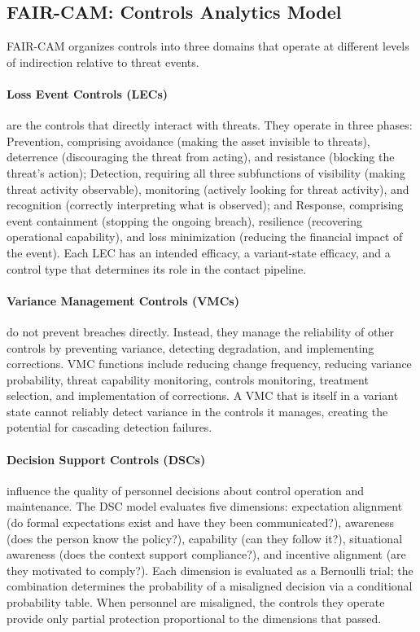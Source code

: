 \documentclass[11pt,a4paper]{article}
\begin{document}
\subsection{FAIR-CAM: Controls Analytics Model}
\label{sec:faircam}

FAIR-CAM organizes controls into three domains that operate at different levels of indirection relative to threat events.

\paragraph{Loss Event Controls (LECs)} are the controls that directly interact with threats. They operate in three phases: Prevention, comprising avoidance (making the asset invisible to threats), deterrence (discouraging the threat from acting), and resistance (blocking the threat's action); Detection, requiring all three subfunctions of visibility (making threat activity observable), monitoring (actively looking for threat activity), and recognition (correctly interpreting what is observed); and Response, comprising event containment (stopping the ongoing breach), resilience (recovering operational capability), and loss minimization (reducing the financial impact of the event). Each LEC has an intended efficacy, a variant-state efficacy, and a control type that determines its role in the contact pipeline.

\paragraph{Variance Management Controls (VMCs)} do not prevent breaches directly. Instead, they manage the reliability of other controls by preventing variance, detecting degradation, and implementing corrections. VMC functions include reducing change frequency, reducing variance probability, threat capability monitoring, controls monitoring, treatment selection, and implementation of corrections. A VMC that is itself in a variant state cannot reliably detect variance in the controls it manages, creating the potential for cascading detection failures.

\paragraph{Decision Support Controls (DSCs)} influence the quality of personnel decisions about control operation and maintenance. The DSC model evaluates five dimensions: expectation alignment (do formal expectations exist and have they been communicated?), awareness (does the person know the policy?), capability (can they follow it?), situational awareness (does the context support compliance?), and incentive alignment (are they motivated to comply?). Each dimension is evaluated as a Bernoulli trial; the combination determines the probability of a misaligned decision via a conditional probability table. When personnel are misaligned, the controls they operate provide only partial protection proportional to the dimensions that passed.
\end{document}
